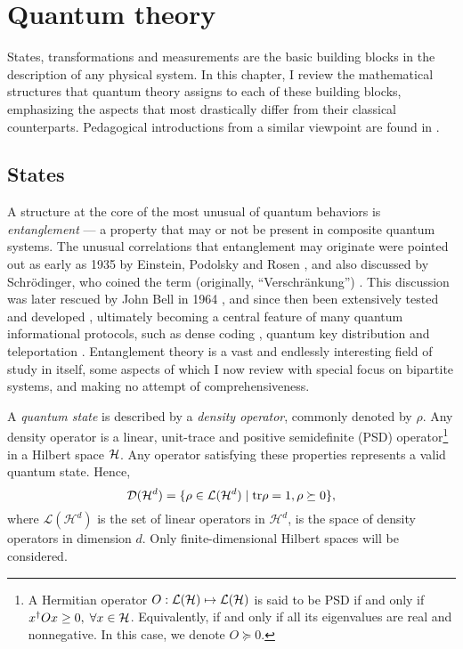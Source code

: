
\chapter{Quantum theory}
\label{chap:quantum-theory}

	States, transformations and measurements are the basic building blocks in the description of any physical system. In this chapter, I review the mathematical structures that quantum theory assigns to each of these building blocks, emphasizing the aspects that most drastically differ from their classical counterparts. Pedagogical introductions from a similar viewpoint are found in \cite{nielsen_chuang_book,barnett_book,terra_amaral_baraviera_livro,wilde_2013_book,schumacher2010book}.

	\section{States}
	\label{sec:states}

		A structure at the core of the most unusual of quantum behaviors is \emph{entanglement} --- a property that may or not be present in composite quantum systems. The unusual correlations that entanglement may originate were pointed out as early as 1935 by Einstein, Podolsky and Rosen \cite{epr}, and also discussed by Schrödinger, who coined the term (originally, ``Verschränkung'') \cite{schrodinger_1935}. This discussion was later rescued by John Bell in 1964 \cite{bell_1964}, and since then been extensively tested and developed \cite{horodecki_2009_entanglement}, ultimately becoming a central feature of many quantum informational protocols, such as dense coding \cite{bennett_1992_superdense}, quantum key distribution \cite{bb84} and teleportation \cite{bennett_1993_teleporting}. Entanglement theory is a vast and endlessly interesting field of study in itself, some aspects of which I now review with special focus on bipartite systems, and making no attempt of comprehensiveness.

		\ornamentbreak
	
		A \emph{quantum state} is described by a \emph{density operator}, commonly denoted by $\rho$. Any density operator is a linear, unit-trace and positive semidefinite (PSD) operator\footnote{A Hermitian operator $O : \mathcal{L}(\mathcal{H}) \mapsto \mathcal{L}(\mathcal{H})$ is said to be PSD if and only if $x^\dag O x \geq 0, \;\forall x \in \mathcal{H}$. Equivalently, if and only if all its eigenvalues are real and nonnegative. In this case, we denote $O \succeq 0$.} in a Hilbert space $\mathcal{H}$. Any operator satisfying these properties represents a valid quantum state. Hence,
		\begin{equation}
			\mathcal{D}(\mathcal{H}^{d}) = \{ \rho \in \mathcal{L}(\mathcal{H}^d) \mid \text{tr}\rho=1, \rho \succeq0 \} , 
			\label{eq:density-operator}
		\end{equation}
		where $\mathcal{L}(\mathcal{H}^d)$ is the set of linear operators in $\mathcal{H}^d$, is the space of density operators in dimension $d$. Only finite-dimensional Hilbert spaces will be considered.
	

